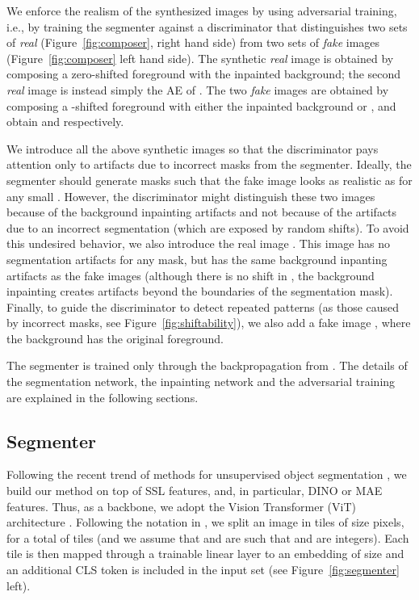 \documentclass{article}
\begin{document}
We enforce the realism of the synthesized images  by  using adversarial training, 
i.e., by training the segmenter against a discriminator that distinguishes 
two sets of \textit{real} (Figure~\ref{fig:composer}, right hand side) from two sets of \textit{fake} images (Figure~\ref{fig:composer} left hand side). 
The synthetic \textit{real} image  is obtained by composing a zero-shifted foreground with the inpainted background; the second \textit{real} image  is instead simply the AE of .
The two \textit{fake} images are obtained by composing a -shifted foreground with either the inpainted background  or , and obtain 
 and  respectively.

We introduce all the above synthetic images so that the discriminator pays attention only to artifacts due to incorrect masks from the segmenter. 
Ideally, the segmenter should generate masks such that the fake image  looks as realistic as  for any small . However, the discriminator might distinguish these two images because of the background inpainting artifacts and not because of the artifacts due to an incorrect segmentation (which are exposed by random shifts). To avoid this undesired behavior, we also introduce the real image . This image has no segmentation artifacts for any mask, but has the same background inpanting artifacts as the fake images (although there is no shift in , the background inpainting creates artifacts beyond the boundaries of the segmentation mask). Finally, to guide the discriminator to detect repeated patterns (as those caused by incorrect masks, see Figure~\ref{fig:shiftability}), we also add a fake image , where the background has the original foreground. 

The segmenter is trained only through the backpropagation from . The details of the segmentation network, the inpainting network and the adversarial training are explained in the following sections.





\subsection{Segmenter}

Following the recent trend of methods for unsupervised object segmentation \cite{amir2021deep,wang2022freesolo,yin2021transfgu,LOST,wang2022self,Shin2022selfmask,melas2022}, we build our method on top of SSL features, and, in particular, DINO \cite{caron2021emerging} or MAE \cite{he2021masked} features. 
Thus, as a backbone, we adopt the Vision Transformer (ViT) architecture \cite{dosovitskiy2020image}. Following the notation in \cite{LOST}, we split an image  in tiles of size  pixels, for a total of  tiles (and we assume that  and  are such that  and  are integers). Each tile is then mapped through a trainable linear layer to an embedding of size  and an additional CLS token is included in the input set (see Figure~\ref{fig:segmenter} left). 
\end{document}
